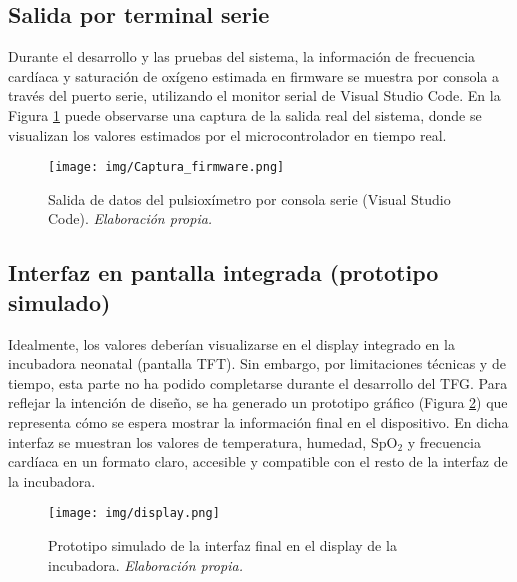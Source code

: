 \subsection{Salida por terminal serie}

Durante el desarrollo y las pruebas del sistema, la información de frecuencia cardíaca y saturación de oxígeno estimada en firmware se muestra por consola a través del puerto serie, utilizando el monitor serial de Visual Studio Code. En la Figura \ref{fig: Captura_firmware} puede observarse una captura de la salida real del sistema, donde se visualizan los valores estimados por el microcontrolador en tiempo real.

\begin{figure}[H]
    \centering
    \texttt{[image: img/Captura\_firmware.png]}
    \caption{Salida de datos del pulsioxímetro por consola serie (Visual Studio Code). \textit{Elaboración propia.}}
    \label{fig: Captura_firmware}
\end{figure}

\subsection{Interfaz en pantalla integrada (prototipo simulado)}

Idealmente, los valores deberían visualizarse en el display integrado en la incubadora neonatal (pantalla TFT). Sin embargo, por limitaciones técnicas y de tiempo, esta parte no ha podido completarse durante el desarrollo del TFG. Para reflejar la intención de diseño, se ha generado un prototipo gráfico (Figura \ref{fig:display_mockup}) que representa cómo se espera mostrar la información final en el dispositivo. En dicha interfaz se muestran los valores de temperatura, humedad, SpO$_2$ y frecuencia cardíaca en un formato claro, accesible y compatible con el resto de la interfaz de la incubadora.

\begin{figure}[H]
    \centering
    \texttt{[image: img/display.png]}
    \caption{Prototipo simulado de la interfaz final en el display de la incubadora. \textit{Elaboración propia.}}
    \label{fig:display_mockup}
\end{figure}






